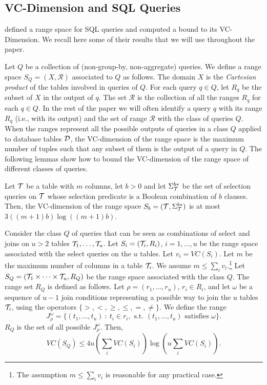\subsection{VC-Dimension and SQL Queries}\label{sec:vcdimquer}
\citet{RiondatoACZU11} defined a range space for SQL queries and computed a
bound to its VC-Dimension. We recall here some of their results that we will use
throughout the paper.

Let $Q$ be a collection of (non-group-by, non-aggregate) queries. We define a
range space $S_Q=(X,\mathcal{R})$ associated to $Q$ as follows. The domain $X$
is the \emph{Cartesian product} of the tables involved in queries of $Q$. For
each query $q\in Q$, let $R_q$ be the subset of $X$ in the output of $q$. The
set $\mathcal{R}$ is the collection of all the ranges $R_q$ for each $q\in Q$.
In the rest of the paper we will often identify a query $q$ with its range $R_q$
(i.e., with its output) and the set of range $\mathcal{R}$ with the class of
queries $Q$. When the ranges represent all the possible outputs of queries in a class $Q$
applied to database tables ${\cal D}$, the VC-dimension of the range space is the maximum
number of tuples such that any subset of them is the output of a query in $Q$.
The following lemmas show how to bound the VC-dimension of the
range space of different classes of queries.

\begin{lemma}\label{lem:vcdimselgen}
  Let ${\cal T}$ be a table with $m$ columns, let $b>0$ and let $\Sigma^{b*}_{\cal T}$
  be the set of selection queries on ${\cal T}$ whose selection predicate is a
  Boolean combination of $b$ clauses. Then, the VC-dimension of the range space
  $S_b = ({\cal T}, \Sigma^{b*}_{\cal T})$ is at most $3((m+1)b)\log((m+1)b)$.  
\end{lemma}

\begin{lemma}\label{lem:vcdimjoinmul}
  Consider the class $Q$ of queries that can be seen as combinations of select
  and joins on $u>2$ tables ${\cal T}_1,\dotsc,{\cal T}_u$. Let $S_i=({\cal T}_i,R_i)$,
  $i=1,\dotsc,u$ be the range space associated with the select queries on the $u$
  tables. Let $v_i=VC(S_i)$. Let $m$ be the maximum number of columns in a table
  ${\cal T}_i$. We assume $m\le \sum_i v_i$.\footnote{The assumption $m\le \sum_i
  v_i$ is reasonable for any practical case.} Let $S_Q = ({\cal T}_1\times\dotsb\times
  {\cal T}_u, R_Q)$ be the range space associated with the class $Q$. The range set
  $R_Q$ is defined as follows. Let $\rho = (r_1,\dotsc,r_u)$, $r_i\in R_i$, and
  let $\omega$ be a sequence of
  $u-1$ join conditions representing a possible way to join the $u$ tables ${\cal T}_i$,
  using the operators $\{>,<,\ge,\le,=,\neq\}$. We define the range 
  \[
  J^\omega_{\rho} = \{(t_1,\dotsc,t_u) ~:~ t_i\in r_i, \mbox{ s.t. }
  (t_1,\dotsc,t_u) \mbox{ satisfies } \omega\}.\]
  $R_Q$ is the set of all possible $J^\omega_{\rho}$. Then,
  \[
  VC(S_Q)\leq 4u(\sum_i VC(S_i))\log(u\sum_i VC(S_i)).
  \]
\end{lemma}

